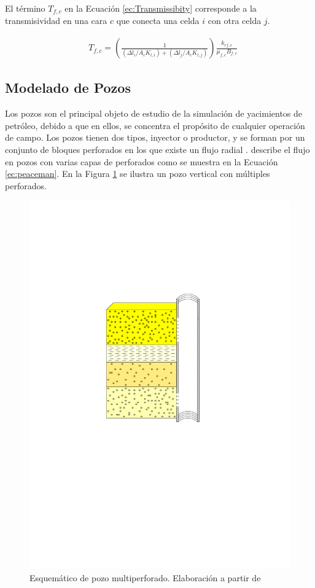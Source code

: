 El término $T_{f,c}$ en la Ecuación \ref{ec:Transmissibity} corresponde a la transmisividad en una cara $c$ que conecta una celda $i$ con otra celda $j$.

\begin{align}
	\label{ec:Transmissibity}& T_{f,c} = \left(\frac{1}{(\Delta l_{i}/A_{c}K_{l,i})+(\Delta l_{j}/A_{c}K_{l,j})}\right)\frac{k_{rf,c}}{\mu_{f,c}B_{f,c}}
\end{align}
\subsection{Modelado de Pozos}
%
Los pozos son el principal objeto de estudio de la simulación de yacimientos de petróleo, debido a que en ellos, se concentra el propósito de cualquier operación de campo. Los pozos tienen dos tipos, inyector o productor, y se forman por un conjunto de bloques perforados en los que existe un flujo radial \citep{peaceman1983interpretation}. \cite{peaceman1983interpretation} describe el flujo en pozos con varias capas de perforados como se muestra en la Ecuación \ref{ec:peaceman}. En la Figura \ref{fig:mulperfwell} se ilustra un pozo vertical con múltiples perforados.

\begin{figure}[h]
	\centering%
	\includegraphics[scale=0.8]{Fig/pozo_multi_perf.pdf}%
	\caption[Esquemático de pozo multiperforado.]{Esquemático de pozo multiperforado. Elaboración a partir de \cite{chen2007reservoir}} \label{fig:mulperfwell}
\end{figure}

